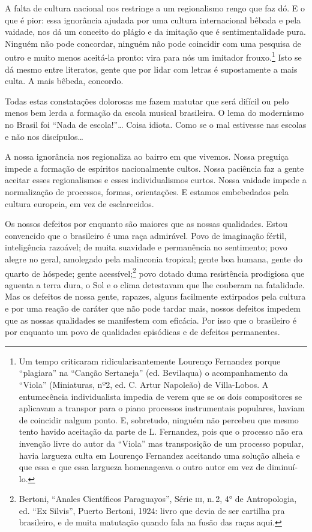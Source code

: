 A falta de cultura nacional nos restringe a um regionalismo rengo que
faz dó. E o que é pior: essa ignorância ajudada por uma cultura
internacional bêbada e pela vaidade, nos dá um conceito do plágio e da
imitação que é sentimentalidade pura. Ninguém não pode concordar,
ninguém não pode coincidir com uma pesquisa de outro e muito menos
aceitá-la pronto: vira para nós um imitador frouxo.\footnote{Um tempo criticaram ridicularisantemente Lourenço Fernandez porque ``plagiara'' na ``Canção Sertaneja'' (ed. Bevilaqua) o acompanhamento da ``Viola'' (Miniaturas, nº2, ed. C. Artur Napoleão) de Villa-Lobos. A entumecência individualista impedia de verem que se os dois compositores se aplicavam a transpor para o piano processos instrumentais populares, haviam de coincidir nalgum ponto. E, sobretudo, ninguém não percebeu que mesmo tento havido aceitação da parte de L. Fernandez, pois que o processo não era invenção livre do autor da ``Viola'' mas transposição de um processo popular, havia largueza culta em Lourenço Fernandez aceitando uma solução alheia e que essa e que essa largueza homenageava o outro autor em vez de diminuí-lo.} Isto se dá mesmo entre literatos, gente que por lidar com letras é
supostamente a mais culta. A mais bêbeda, concordo.

Todas estas constatações dolorosas me fazem matutar que será difícil ou
pelo menos bem lerda a formação da escola musical brasileira. O lema do
modernismo no Brasil foi ``Nada de escola!''\ldots{} Coisa idiota. Como se
o mal estivesse nas escolas e não nos discípulos\ldots{}

A nossa ignorância nos regionaliza ao bairro em que vivemos. Nossa
preguiça impede a formação de espíritos nacionalmente cultos. Nossa
paciência faz a gente aceitar esses regionalismos e esses
individualismos curtos. Nossa vaidade impede a normalização de
processos, formas, orientações. E estamos embebedados pela cultura
europeia, em vez de esclarecidos.

Os nossos defeitos por enquanto são maiores que as nossas qualidades.
Estou convencido que o brasileiro é uma raça admirável. Povo de
imaginação fértil, inteligência razoável; de muita suavidade e
permanência no sentimento; povo alegre no geral, amolegado pela
malinconia tropical; gente boa humana, gente do quarto de hóspede;
gente acessível;\footnote{Bertoni, ``Anales Científicos Paraguayos'', Série \textsc{iii},
n.\,2, 4° de Antropologia, ed. ``Ex Silvis'', Puerto Bertoni, 1924: livro
que devia de ser cartilha pra brasileiro, e de muita matutação quando
fala na fusão das raças aqui.} povo dotado duma resistência prodigiosa
que aguenta a terra dura, o Sol e o clima detestavam que lhe couberam na
fatalidade. Mas os defeitos de nossa gente, rapazes, alguns facilmente
extirpados pela cultura e por uma reação de caráter que não pode tardar
mais, nossos defeitos impedem que as nossas qualidades se manifestem com
eficácia. Por isso que o brasileiro é por enquanto um povo de qualidades
episódicas e de defeitos permanentes.

